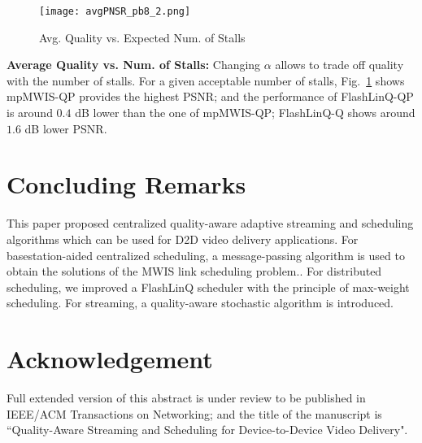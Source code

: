 \documentclass[journal]{IEEEtran}
\begin{document}
\begin{figure}[t!]
	\begin{center}
		\texttt{[image: avgPNSR\_pb8\_2.png]}
	\end{center}
\caption{Avg. Quality vs. Expected Num. of Stalls}
	\label{fig:stall2}
\end{figure}




\textbf{Average Quality vs. Num. of Stalls:}
Changing $\alpha$ allows to trade off quality with the number of stalls. For a given acceptable number of stalls,
Fig.~\ref{fig:stall2} shows mpMWIS-QP provides the highest PSNR; and the performance of FlashLinQ-QP is around $0.4$ dB lower than the one of mpMWIS-QP; FlashLinQ-Q shows around $1.6$ dB lower PSNR.

 \vspace{-1.0mm}
\section{Concluding Remarks}\label{sec:conclusion}
This paper proposed centralized quality-aware adaptive streaming and scheduling algorithms which can be used for D2D video delivery applications.
For basestation-aided centralized scheduling, a message-passing algorithm is used to obtain the solutions of the MWIS link scheduling problem..
For distributed scheduling, we improved a FlashLinQ scheduler with the principle of max-weight scheduling.
For streaming, a quality-aware stochastic algorithm is introduced.

 \vspace{-1.0mm}
\section*{Acknowledgement}\label{sec:conclusion}
Full extended version of this abstract is under review to be published in IEEE/ACM Transactions on Networking; and the title of the manuscript is ``Quality-Aware Streaming and Scheduling for Device-to-Device Video Delivery".
\end{document}
